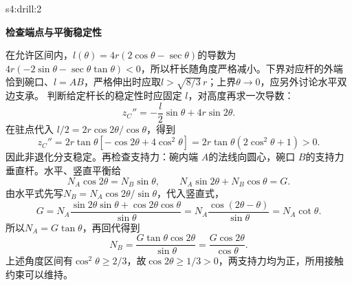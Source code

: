 \begin{drillsolution}{s4:drill:2}
\par\medskip{}\noindent\textbf{检查端点与平衡稳定性}\par\nobreak
在允许区间内，$l(\theta)=4r(2\cos\theta-\sec\theta)$的导数为 $4r(-2\sin\theta-\sec\theta\tan\theta)<0$，所以杆长随角度严格减小。下界对应杆的外端恰到碗口、$l=AB$，严格伸出时应取$l>\sqrt{8/3}\,r$；上界$\theta\to0$，应另外讨论水平双边支承。
判断给定杆长的稳定性时应固定 $l$，对高度再求一次导数：
\[z_C''=-\frac l2\sin\theta+4r\sin2\theta.\]
在驻点代入 $l/2=2r\cos2\theta/\cos\theta$，得到
\[z_C''=2r\tan\theta[-\cos2\theta+4\cos^2\theta]
 =2r\tan\theta(2\cos^2\theta+1)>0.\]
因此非退化分支稳定。再检查支持力：碗内端 $A$的法线向圆心，碗口 $B$的支持力垂直杆。水平、竖直平衡给
\[N_A\cos2\theta=N_B\sin\theta,\qquad
 N_A\sin2\theta+N_B\cos\theta=G.\]
由水平式先写$N_B=N_A\cos2\theta/\sin\theta$，代入竖直式，
\[
G=N_A\frac{\sin2\theta\sin\theta+\cos2\theta\cos\theta}{\sin\theta}
=N_A\frac{\cos(2\theta-\theta)}{\sin\theta}
=N_A\cot\theta.
\]
所以$N_A=G\tan\theta$，再回代得到
\[
N_B=\frac{G\tan\theta\cos2\theta}{\sin\theta}
=\frac{G\cos2\theta}{\cos\theta}.
\]
上述角度区间有$\cos^2\theta\ge2/3$，故$\cos2\theta\ge1/3>0$，两支持力均为正，所用接触约束可以维持。\end{drillsolution}

